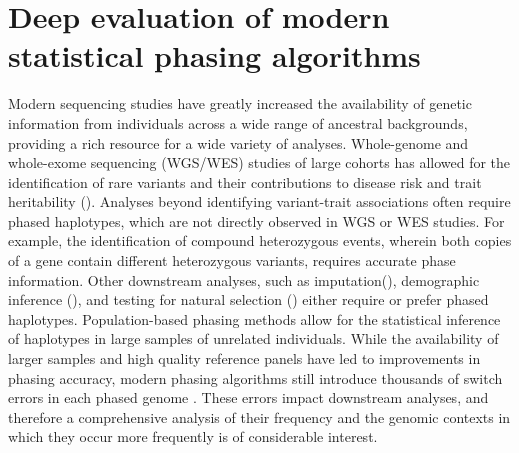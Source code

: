 \chapter{Deep evaluation of modern statistical phasing algorithms}
\label{chpt:phasingEval}

Modern sequencing studies have greatly increased the availability of genetic information from individuals across a wide range of ancestral backgrounds, providing a rich resource for a wide variety of analyses. Whole-genome and whole-exome sequencing (WGS/WES) studies of large cohorts has allowed for the identification of rare variants and their contributions to disease risk and trait heritability (\citep{Wainschtein2022, Wang2021}). Analyses beyond identifying variant-trait associations often require phased haplotypes, which are not directly observed in WGS or WES studies. For example, the identification of compound heterozygous events, wherein both copies of a gene contain different heterozygous variants, requires accurate phase information. Other downstream analyses, such as imputation(\citep{Howie2012,Das2016,Das2018}), demographic inference (\citep{Maples2013,Baran2012,SalterTownshend2019}), and testing for natural selection (\citep{Browning2020NS, Sabeti2002, Hanchard2006, Zhang2006}) either require or prefer phased haplotypes. Population-based phasing methods allow for the statistical inference of haplotypes in large samples of unrelated individuals. While the availability of larger samples and high quality reference panels have led to improvements in phasing accuracy, modern phasing algorithms still introduce thousands of switch errors in each phased genome \cite{Choi2018}. These errors impact downstream analyses, and therefore a comprehensive analysis of their frequency and the genomic contexts in which they occur more frequently is of considerable interest.


